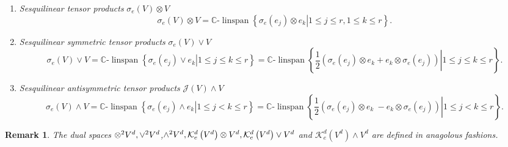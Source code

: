\documentclass[aps,preprint]{revtex4}%
\newtheorem{remark}[theorem]{Remark}
\begin{document}
\begin{enumerate}
\begin{enumerate}
\item The full tensor product space ${\Large \otimes}^{2}V$ is the sum of the
symmetric and antisymmetric tensor product spaces i.e.%
\begin{equation}
{\Large \otimes}^{2}V={\huge \vee}^{2}V\oplus{\huge \wedge}^{2}V.
\end{equation}

\end{enumerate}

\item \emph{Sesquilinear tensor products} $\mathcal{\sigma}_{e}\left(
V\right)  \otimes V$
\begin{equation}
\mathcal{\sigma}_{e}\left(  V\right)  \otimes V=\mathbb{C}\text{-}%
\operatorname*{linspan}\left\{  \left.  \mathcal{\sigma}_{e}\left(
e_{j}\right)  \otimes e_{k}\right\vert 1\leq j\leq r,1\leq k\leq r\right\}  .
\end{equation}


\item \emph{Sesquilinear symmetric tensor products }$\mathcal{\sigma}%
_{e}\left(  V\right)  \vee V$%
\begin{equation}
\mathcal{\sigma}_{e}\left(  V\right)  \vee V=\mathbb{C}\text{-}%
\operatorname*{linspan}\left\{  \left.  \mathcal{\sigma}_{e}\left(
e_{j}\right)  \vee e_{k}\right\vert 1\leq j\leq k\leq r\right\}
=\mathbb{C}\text{-}\operatorname*{linspan}\left\{  \left.  \frac{1}{2}\left(
\mathcal{\sigma}_{e}\left(  e_{j}\right)  \otimes e_{k}+e_{k}\otimes
\mathcal{\sigma}_{e}\left(  e_{j}\right)  \right)  \right\vert 1\leq j\leq
k\leq r\right\}  .
\end{equation}


\item \emph{Sesquilinear antisymmetric tensor products} $\mathcal{J}\left(
V\right)  \wedge V$%
\begin{equation}
\mathcal{\sigma}_{e}\left(  V\right)  \wedge V=\mathbb{C}\text{-}%
\operatorname*{linspan}\left\{  \left.  \mathcal{\sigma}_{e}\left(
e_{j}\right)  \wedge e_{k}\right\vert 1\leq j<k\leq r\right\}  =\mathbb{C}%
\text{-}\operatorname*{linspan}\left\{  \left.  \frac{1}{2}\left(
\mathcal{\sigma}_{e}\left(  e_{j}\right)  \otimes e_{k}\ -e_{k}\otimes
\mathcal{\sigma}_{e}\left(  e_{j}\right)  \right)  \right\vert 1\leq j<k\leq
r\right\}  .
\end{equation}

\end{enumerate}

\begin{remark}
The dual spaces ${\Large \otimes}^{2}V^{d},{\huge \vee}^{2}V^{d}%
$,${\huge \wedge}^{2}V^{d},\mathcal{K}_{e}^{d}\left(  V^{d}\right)  \otimes
V^{d},\mathcal{K}_{e}^{d}\left(  V^{d}\right)  \vee V^{d}$ and $\mathcal{K}%
_{e}^{d}\left(  V^{d}\right)  \wedge V^{d}$ are defined in anagolous fashions.
\end{remark}
\end{document}
